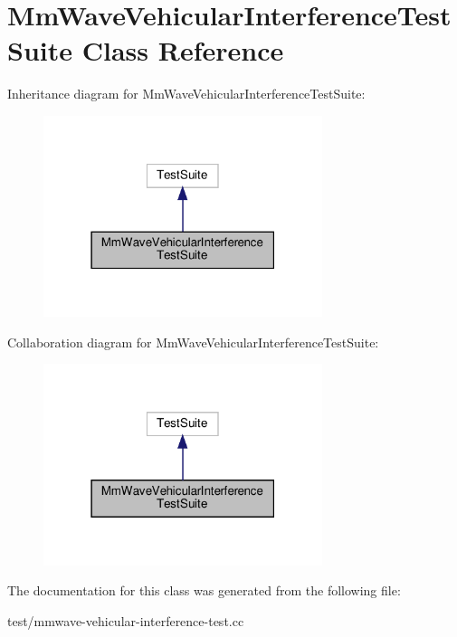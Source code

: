 \hypertarget{classMmWaveVehicularInterferenceTestSuite}{}\section{Mm\+Wave\+Vehicular\+Interference\+Test\+Suite Class Reference}
\label{classMmWaveVehicularInterferenceTestSuite}


Inheritance diagram for Mm\+Wave\+Vehicular\+Interference\+Test\+Suite\+:\nopagebreak
\begin{figure}[H]
\begin{center}
\leavevmode
\includegraphics[width=231pt]{classMmWaveVehicularInterferenceTestSuite__inherit__graph}
\end{center}
\end{figure}


Collaboration diagram for Mm\+Wave\+Vehicular\+Interference\+Test\+Suite\+:\nopagebreak
\begin{figure}[H]
\begin{center}
\leavevmode
\includegraphics[width=231pt]{classMmWaveVehicularInterferenceTestSuite__coll__graph}
\end{center}
\end{figure}


The documentation for this class was generated from the following file\+:\begin{DoxyCompactItemize}
\item 
test/mmwave-\/vehicular-\/interference-\/test.\+cc\end{DoxyCompactItemize}
